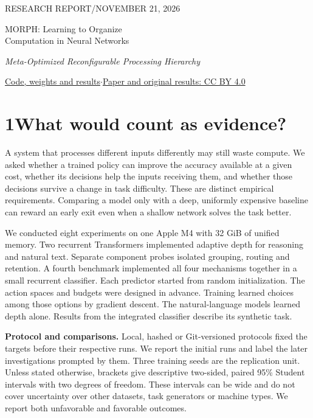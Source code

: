 \documentclass[11pt,letterpaper]{article}
\newcommand{\topic}[1]{\par\medskip\noindent\textbf{#1}\enspace}
\begin{document}
\thispagestyle{plain}
{\sffamily\small\color{teal}RESEARCH REPORT\quad /\quad NOVEMBER 21, 2026}\par\vspace{6pt}
{\fontsize{27}{31}\selectfont\bfseries\raggedright\color{ink}MORPH: Learning to Organize\\Computation in Neural Networks\par}
\vspace{5pt}{\large Joseph Defendre}\par
\textit{Meta-Optimized Reconfigurable Processing Hierarchy}\par
{\small\href{https://github.com/jchacker5/MORPH}{Code, weights and results}\quad$\cdot$\quad\href{https://creativecommons.org/licenses/by/4.0/}{Paper and original results: CC BY 4.0}}\par

\section*{1\quad What would count as evidence?}
A system that processes different inputs differently may still waste compute. We asked whether a trained policy can improve the accuracy available at a given cost, whether its decisions help the inputs receiving them, and whether those decisions survive a change in task difficulty. These are distinct empirical requirements. Comparing a model only with a deep, uniformly expensive baseline can reward an early exit even when a shallow network solves the task better.

We conducted eight experiments on one Apple M4 with 32 GiB of unified memory. Two recurrent Transformers implemented adaptive depth for reasoning and natural text. Separate component probes isolated grouping, routing and retention. A fourth benchmark implemented all four mechanisms together in a small recurrent classifier. Each predictor started from random initialization. The action spaces and budgets were designed in advance. Training learned choices among those options by gradient descent. The natural-language models learned depth alone. Results from the integrated classifier describe its synthetic task.

\topic{Protocol and comparisons.} Local, hashed or Git-versioned protocols fixed the targets before their respective runs. We report the initial runs and label the later investigations prompted by them. Three training seeds are the replication unit. Unless stated otherwise, brackets give descriptive two-sided, paired 95\% Student intervals with two degrees of freedom. These intervals can be wide and do not cover uncertainty over other datasets, task generators or machine types. We report both unfavorable and favorable outcomes.
\newpage
\end{document}
